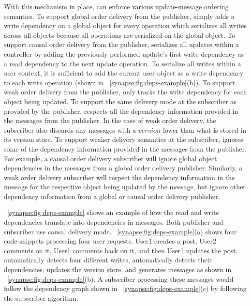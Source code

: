 With this mechanism in place, \synapse can enforce various
update-message ordering semantics.  To support global order delivery
from the publisher, \synapse simply adds a write dependency on a
global object for every operation which serializes all writes across
all objects because all operations are serialized on the global object.
To support causal order delivery from the publisher, \synapse
serializes all updates within a controller by adding the previously
performed update's first write dependency as a read dependency to the
next update operation.  To serialize all writes within a user context,
it is sufficient to add the current user object as a write dependency
to each write operation (shown in \F~\ref{synapse:fig:deps-example}(b)).
To support weak order delivery from the
publisher, \synapse only tracks the write dependency for each object
being updated.  To support the same delivery mode at the subscriber as
provided by the publisher, \synapse respects all the dependency
information provided in the messages from the publisher.  In the case
of weak order delivery, the subscriber also discards any messages
with a $version$ lower than what is stored in its version store.
To support weaker delivery semantics at the subscriber, \synapse
ignores some of the dependency information provided in the messages
from the publisher.  For example, a causal order delivery subscriber
will ignore global object dependencies in the messages from a
global order delivery publisher.  Similarly, a weak order delivery
subscriber will respect the dependency information in the message
for the respective object being updated by the message, but ignore
other dependency information from a global or causal order delivery
publisher.

\F~\ref{synapse:fig:deps-example} shows an example of how the read and write 
dependencies translate into dependencies in
messages. Both publisher and subscriber use causal delivery mode. \F~\ref{synapse:fig:deps-example}(a) shows four code snippets
processing four user requests.  User1 creates a post, User2
comments on it, User1 comments back on it, and then User1 updates the post.
\synapse automatically detects four different writes, automatically detects
their dependencies, updates the version store, and generates messages
as shown in \F~\ref{synapse:fig:deps-example}(b). A subscriber processing these messages
would follow the dependency graph shown in \F~\ref{synapse:fig:deps-example}(c) by
following the subscriber algorithm.



